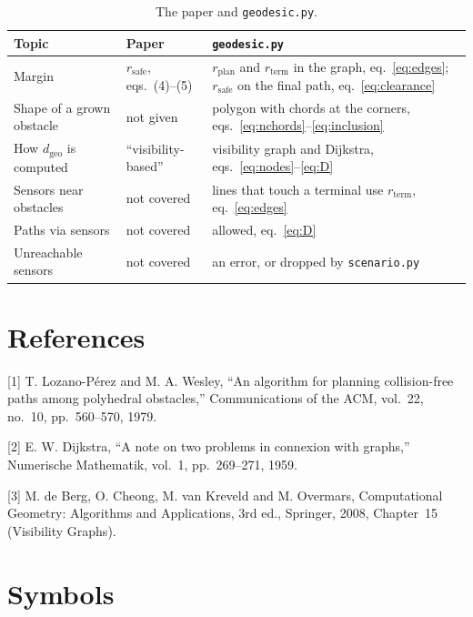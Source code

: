 \documentclass[10pt]{article}
\newcommand{\code}[1]{\texttt{#1}}
\newcommand{\rplan}{r_{\mathrm{plan}}}
\newcommand{\rsafe}{r_{\mathrm{safe}}}
\newcommand{\rterm}{r_{\mathrm{term}}}
\newcommand{\dgeo}{d_{\mathrm{geo}}}
\begin{document}
\begin{table}[h]
\centering
\small
\caption{The paper and \code{geodesic.py}.}
\label{tab:paper}
\begin{tabularx}{\textwidth}{@{}>{\raggedright}p{} >{\raggedright}p{} >{\raggedright\arraybackslash}X@{}}
\toprule
Topic & Paper & \code{geodesic.py} \\
\midrule
Margin & $\rsafe$, eqs.~(4)--(5) & $\rplan$ and $\rterm$ in the graph, eq.~\eqref{eq:edges}; $\rsafe$ on the final path, eq.~\eqref{eq:clearance} \\
Shape of a grown obstacle & not given & polygon with chords at the corners, eqs.~\eqref{eq:nchords}--\eqref{eq:inclusion} \\
How $\dgeo$ is computed & ``visibility-based'' & visibility graph and Dijkstra, eqs.~\eqref{eq:nodes}--\eqref{eq:D} \\
Sensors near obstacles & not covered & lines that touch a terminal use $\rterm$, eq.~\eqref{eq:edges} \\
Paths via sensors & not covered & allowed, eq.~\eqref{eq:D} \\
Unreachable sensors & not covered & an error, or dropped by \code{scenario.py} \\
\bottomrule
\end{tabularx}
\end{table}

\section*{References}

[1] T. Lozano-P\'erez and M. A. Wesley, ``An algorithm for planning collision-free paths among polyhedral obstacles,''
Communications of the ACM, vol.~22, no.~10, pp.~560--570, 1979.

[2] E. W. Dijkstra, ``A note on two problems in connexion with graphs,'' Numerische Mathematik, vol.~1, pp.~269--271,
1959.

[3] M. de Berg, O. Cheong, M. van Kreveld and M. Overmars, Computational Geometry: Algorithms and Applications, 3rd ed.,
Springer, 2008, Chapter~15 (Visibility Graphs).

\appendix
\section{Symbols}
\end{document}
